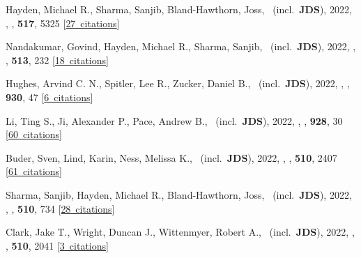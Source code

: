 \item[{\color{numcolor}\scriptsize74}] Hayden, Michael R., Sharma, Sanjib, Bland-Hawthorn, Joss, \etal\ (incl.\ \textbf{JDS}), 2022, , \mnras, \textbf{517}, 5325 [\href{https://ui.adsabs.harvard.edu/#abs/2022MNRAS.517.5325H}{27~citations}]

\item[{\color{numcolor}\scriptsize73}] Nandakumar, Govind, Hayden, Michael R., Sharma, Sanjib, \etal\ (incl.\ \textbf{JDS}), 2022, , \mnras, \textbf{513}, 232 [\href{https://ui.adsabs.harvard.edu/#abs/2022MNRAS.513..232N}{18~citations}]

\item[{\color{numcolor}\scriptsize72}] Hughes, Arvind C. N., Spitler, Lee R., Zucker, Daniel B., \etal\ (incl.\ \textbf{JDS}), 2022, , \apj, \textbf{930}, 47 [\href{https://ui.adsabs.harvard.edu/#abs/2022ApJ...930...47H}{6~citations}]

\item[{\color{numcolor}\scriptsize71}] Li, Ting S., Ji, Alexander P., Pace, Andrew B., \etal\ (incl.\ \textbf{JDS}), 2022, , \apj, \textbf{928}, 30 [\href{https://ui.adsabs.harvard.edu/#abs/2022ApJ...928...30L}{60~citations}]

\item[{\color{numcolor}\scriptsize70}] Buder, Sven, Lind, Karin, Ness, Melissa K., \etal\ (incl.\ \textbf{JDS}), 2022, , \mnras, \textbf{510}, 2407 [\href{https://ui.adsabs.harvard.edu/#abs/2022MNRAS.510.2407B}{61~citations}]

\item[{\color{numcolor}\scriptsize69}] Sharma, Sanjib, Hayden, Michael R., Bland-Hawthorn, Joss, \etal\ (incl.\ \textbf{JDS}), 2022, , \mnras, \textbf{510}, 734 [\href{https://ui.adsabs.harvard.edu/#abs/2022MNRAS.510..734S}{28~citations}]

\item[{\color{numcolor}\scriptsize68}] Clark, Jake T., Wright, Duncan J., Wittenmyer, Robert A., \etal\ (incl.\ \textbf{JDS}), 2022, , \mnras, \textbf{510}, 2041 [\href{https://ui.adsabs.harvard.edu/#abs/2022MNRAS.510.2041C}{3~citations}]

